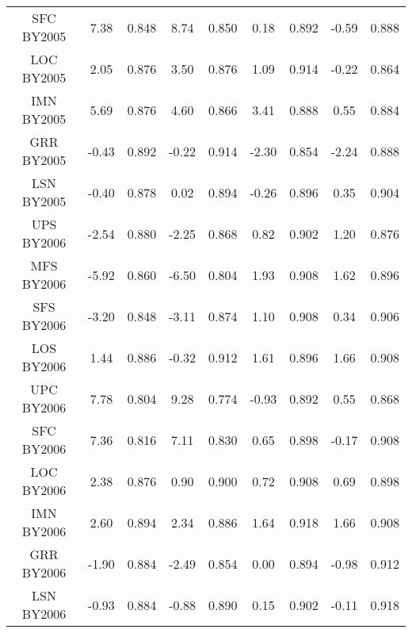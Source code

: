 \documentclass[12pt]{article}
\begin{document}
\begin{table}
{\begin{tabular}{  c c c c c c c c c   }
SFC BY2005&	7.38&	0.848&	8.74&	0.850&	0.18&	0.892&	-0.59&	0.888 \\
LOC BY2005&	2.05&	0.876&	3.50&	0.876&	1.09&	0.914&	-0.22&	0.864 \\
IMN BY2005&	5.69&	0.876&	4.60&	0.866&	3.41&	0.888&	0.55&	0.884 \\
GRR BY2005&	-0.43&	0.892&	-0.22&	0.914&	-2.30&	0.854&	-2.24&	0.888 \\
LSN BY2005&	-0.40&	0.878&	0.02&	0.894&	-0.26&	0.896&	0.35&	0.904 \\
UPS BY2006&	-2.54&	0.880&	-2.25&	0.868&	0.82&	0.902&	1.20&	0.876 \\
MFS BY2006&	-5.92&	0.860&	-6.50&	0.804&	1.93&	0.908&	1.62&	0.896 \\
SFS BY2006&	-3.20&	0.848&	-3.11&	0.874&	1.10&	0.908&	0.34&	0.906 \\
LOS BY2006&	1.44&	0.886&	-0.32&	0.912&	1.61&	0.896&	1.66&	0.908 \\
UPC BY2006&	7.78&	0.804&	9.28&	0.774&	-0.93&	0.892&	0.55&	0.868 \\
SFC BY2006&	7.36&	0.816&	7.11&	0.830&	0.65&	0.898&	-0.17&	0.908 \\
LOC BY2006&	2.38&	0.876&	0.90&	0.900&	0.72&	0.908&	0.69&	0.898 \\
IMN BY2006&	2.60&	0.894&	2.34&	0.886&	1.64&	0.918&	1.66&	0.908 \\
GRR BY2006&	-1.90&	0.884&	-2.49&	0.854&	0.00&	0.894&	-0.98&	0.912 \\
LSN BY2006&	-0.93&	0.884&	-0.88&	0.890&	0.15&	0.902&	-0.11&	0.918 \\
\end{tabular}
}
\end{table}	
\end{document}
